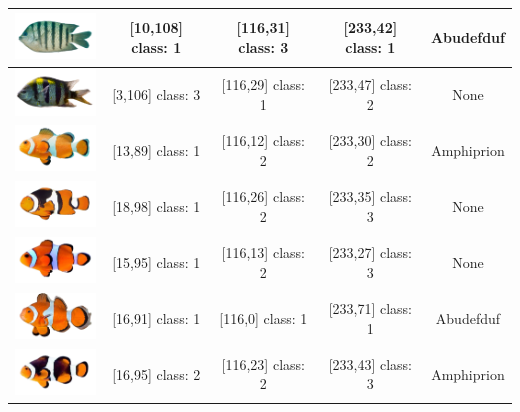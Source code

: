 \begin{longtable}{|c|c|c|c|c|}
	\hline
	\includegraphics[width=3cm]{gambar/dataset_validasi/Abudefduf24}
	& [10,108] class: 1 & [116,31] class: 3 & [233,42] class: 1 & Abudefduf \\
	\hline
	\includegraphics[width=3cm]{gambar/dataset_validasi/Abudefduf25}
	& [3,106] class: 3 & [116,29] class: 1 & [233,47] class: 2 & None \\
	\hline
	\includegraphics[width=3cm]{gambar/dataset_validasi/Amphiprion01} & [13,89] class: 1 & [116,12] class: 2 & [233,30] class: 2 & Amphiprion \\ \hline
	\includegraphics[width=3cm]{gambar/dataset_validasi/Amphiprion02} & [18,98] class: 1 & [116,26] class: 2 & [233,35] class: 3 & None \\ \hline
	\includegraphics[width=3cm]{gambar/dataset_validasi/Amphiprion03} & [15,95] class: 1 & [116,13] class: 2 & [233,27] class: 3 & None \\ \hline
	\includegraphics[width=3cm]{gambar/dataset_validasi/Amphiprion04} & [16,91] class: 1 & [116,0] class: 1 & [233,71] class: 1 & Abudefduf \\ \hline
	\includegraphics[width=3cm]{gambar/dataset_validasi/Amphiprion05} & [16,95] class: 2 & [116,23] class: 2 & [233,43] class: 3 & Amphiprion \\ \hline

\end{longtable}
